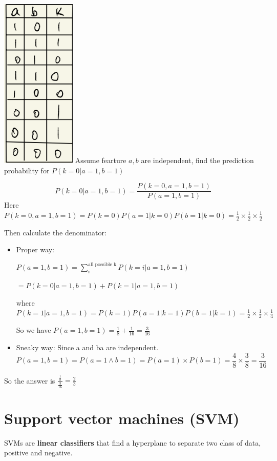\documentclass[letterpaper,12pt]{article}
\begin{document}
\includegraphics{./Image/Bayesian example.png}
Assume fearture $a,b$ are independent, find the prediction probability for $P(k=0|a=1,b=1)$

\[
    P(k=0|a=1,b=1)=\frac{P(k=0,a=1,b=1)}{P(a=1,b=1)}
\]
Here $P(k=0,a=1,b=1)=P(k=0)P(a=1|k=0)P(b=1|k=0)=\frac{1}{2} \times \frac{1}{2}
    \times \frac{1}{2}$

Then calculate the denominator:
\begin{itemize}
    \item Proper way:

          $P(a=1,b=1)=\sum_{i}^{\text{all possible k}}P(k=i|a=1,b=1)$

          $=P(k=0|a=1,b=1)+P(k=1|a=1,b=1)$

          where $P(k=1|a=1,b=1)=P(k=1)P(a=1|k=1)P(b=1|k=1)=\frac{1}{2} \times \frac{1}{2}
              \times \frac{1}{4}$

          So we have $P(a=1,b=1)=\frac{1}{8}+\frac{1}{16}=\frac{3}{16}$

    \item Sneaky way: Since a and ba are independent.
          \[
              P(a=1,b=1)=P(a=1\land b=1)=P(a=1)\times P(b=1) = \frac{4}{8} \times \frac{3}{8} =\frac{3}{16}
          \]
\end{itemize}

So the answer is $\frac{\frac{1}{8}}{\frac{3}{16}}=\frac{2}{3}$

\section{Support vector machines (SVM)}
SVMs are \textbf{linear classifiers} that find a hyperplane to separate two
class of data, positive and negative.
\end{document}

